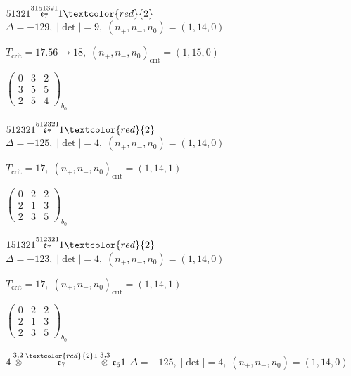 \documentclass[10pt]{article}
\begin{document}
\smallskip

$51321\overset{3151321}{\mathfrak{e}_7}1\textcolor{red}{2}$ \quad $\Delta=-129,\; |\det|=9,\; (n_+,n_-,n_0)=(1,14,0)$

\hspace{1em}$T_{\text{crit}}=17.56 \to 18,\; (n_+,n_-,n_0)_{\text{crit}}=(1,15,0)$

\hspace{2em}$\left(\begin{smallmatrix}0 & 3 & 2 \\ 3 & 5 & 5 \\ 2 & 5 & 4\end{smallmatrix}\right)_{\!b_0}$

\smallskip

$512321\overset{512321}{\mathfrak{e}_7}1\textcolor{red}{2}$ \quad $\Delta=-125,\; |\det|=4,\; (n_+,n_-,n_0)=(1,14,0)$

\hspace{1em}$T_{\text{crit}}=17,\; (n_+,n_-,n_0)_{\text{crit}}=(1,14,1)$

\hspace{2em}$\left(\begin{smallmatrix}0 & 2 & 2 \\ 2 & 1 & 3 \\ 2 & 3 & 5\end{smallmatrix}\right)_{\!b_0}$

\smallskip

$151321\overset{512321}{\mathfrak{e}_7}1\textcolor{red}{2}$ \quad $\Delta=-123,\; |\det|=4,\; (n_+,n_-,n_0)=(1,14,0)$

\hspace{1em}$T_{\text{crit}}=17,\; (n_+,n_-,n_0)_{\text{crit}}=(1,14,1)$

\hspace{2em}$\left(\begin{smallmatrix}0 & 2 & 2 \\ 2 & 1 & 3 \\ 2 & 3 & 5\end{smallmatrix}\right)_{\!b_0}$

\smallskip

$4\overset{3,2}{\otimes}\overset{\textcolor{red}{2}1}{\mathfrak{e}_7}\overset{3,3}{\otimes}\mathfrak{e}_61$ \quad $\Delta=-125,\; |\det|=4,\; (n_+,n_-,n_0)=(1,14,0)$
\end{document}

